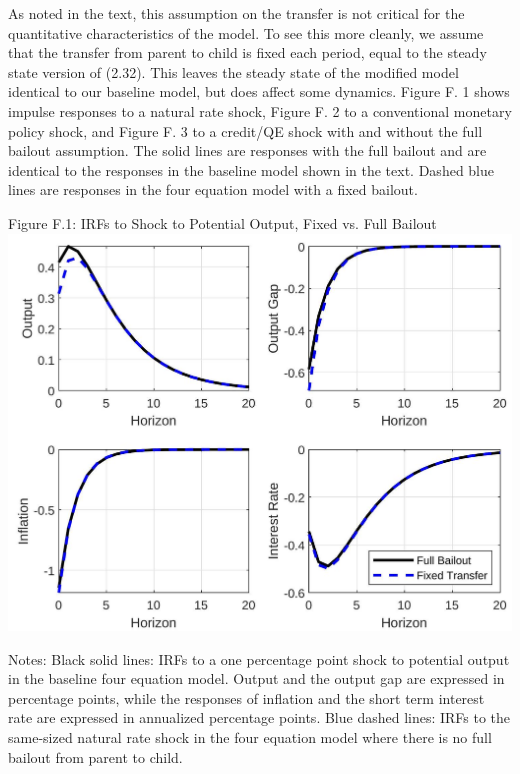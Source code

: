 \documentclass[10pt]{article}
\begin{document}
As noted in the text, this assumption on the transfer is not critical for the quantitative characteristics of the model. To see this more cleanly, we assume that the transfer from parent to child is fixed each period, equal to the steady state version of (2.32). This leaves the steady state of the modified model identical to our baseline model, but does affect some dynamics. Figure F. 1 shows impulse responses to a natural rate shock, Figure F. 2 to a conventional monetary policy shock, and Figure F. 3 to a credit/QE shock with and without the full bailout assumption. The solid lines are responses with the full bailout and are identical to the responses in the baseline model shown in the text. Dashed blue lines are responses in the four equation model with a fixed bailout.

Figure F.1: IRFs to Shock to Potential Output, Fixed vs. Full Bailout\\
\includegraphics[max width=\textwidth, center]{2024_12_20_23d1456f4ac472ebd83dg-11}

Notes: Black solid lines: IRFs to a one percentage point shock to potential output in the baseline four equation model. Output and the output gap are expressed in percentage points, while the responses of inflation and the short term interest rate are expressed in annualized percentage points. Blue dashed lines: IRFs to the same-sized natural rate shock in the four equation model where there is no full bailout from parent to child.
\end{document}
